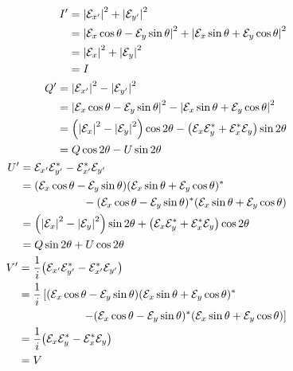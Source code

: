 \documentclass[../../main.tex]{subfiles}
\begin{document}
\begin{align}
    \begin{split}
        I' &= \abs{\mathcal{E}_{x'}}^{2} + \abs{\mathcal{E}_{y'}}^{2} \\
           &= \abs{\mathcal{E}_{x}\cos\theta - \mathcal{E}_{y}\sin\theta}^{2} + \abs{\mathcal{E}_{x}\sin\theta + \mathcal{E}_{y}\cos\theta}^{2} \\
           &= \abs{\mathcal{E}_{x}}^{2} + \abs{\mathcal{E}_{y}}^{2} \\
           &= I
    \end{split} \\
    \begin{split}
        Q' &= \abs{\mathcal{E}_{x'}}^{2} - \abs{\mathcal{E}_{y'}}^{2} \\
           &= \abs{\mathcal{E}_{x}\cos\theta - \mathcal{E}_{y}\sin\theta}^{2} - \abs{\mathcal{E}_{x}\sin\theta + \mathcal{E}_{y}\cos\theta}^{2} \\
           &= \qty(\abs{\mathcal{E}_{x}}^{2} - \abs{\mathcal{E}_{y}}^{2})\cos2\theta - \qty(\mathcal{E}_{x}\mathcal{E}_{y}^{*} + \mathcal{E}_{x}^{*}\mathcal{E}_{y})\sin2\theta \\
           &= Q\cos2\theta - U\sin2\theta
    \end{split} \\
    \begin{split}
        U' &= \mathcal{E}_{x'}\mathcal{E}_{y'}^{*} - \mathcal{E}_{x'}^{*}\mathcal{E}_{y'} \\
           &= (\mathcal{E}_{x}\cos\theta - \mathcal{E}_{y}\sin\theta)(\mathcal{E}_{x}\sin\theta + \mathcal{E}_{y}\cos\theta)^{*} \\
                &\hspace{2cm} - (\mathcal{E}_{x}\cos\theta - \mathcal{E}_{y}\sin\theta)^{*}(\mathcal{E}_{x}\sin\theta + \mathcal{E}_{y}\cos\theta) \\
           &= \qty(\abs{\mathcal{E}_{x}}^{2} - \abs{\mathcal{E}_{y}}^{2})\sin2\theta + \qty(\mathcal{E}_{x}\mathcal{E}_{y}^{*} + \mathcal{E}_{x}^{*}\mathcal{E}_{y})\cos2\theta \\
           &= Q\sin2\theta + U\cos2\theta
    \end{split} \\
    \begin{split}
        V' &= \dfrac{1}{i}\qty(\mathcal{E}_{x'}\mathcal{E}_{y'}^{*} - \mathcal{E}_{x'}^{*}\mathcal{E}_{y'}) \\
              &= \dfrac{1}{i}\left[(\mathcal{E}_{x}\cos\theta - \mathcal{E}_{y}\sin\theta)(\mathcal{E}_{x}\sin\theta + \mathcal{E}_{y}\cos\theta)^{*} \right. \\
              &\hspace{2cm} \left.- (\mathcal{E}_{x}\cos\theta - \mathcal{E}_{y}\sin\theta)^{*}(\mathcal{E}_{x}\sin\theta + \mathcal{E}_{y}\cos\theta) \right] \\
           &= \dfrac{1}{i}\qty(\mathcal{E}_{x}\mathcal{E}_{y}^{*} - \mathcal{E}_{x}^{*}\mathcal{E}_{y}) \\
           &= V
    \end{split}
\end{align}
\end{document}
